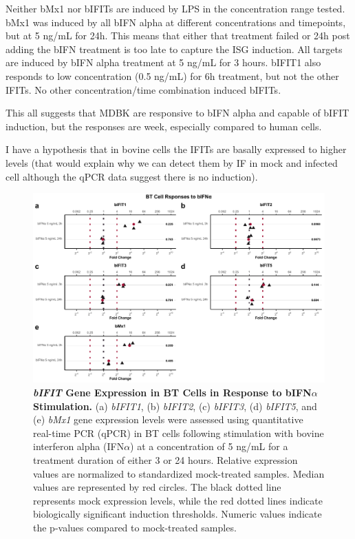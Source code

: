 Neither bMx1 nor bIFITs are induced by LPS in the concentration range tested. bMx1 was induced by all bIFN alpha at different concentrations and timepoints, but at 5 ng/mL for 24h. This means that either that treatment failed or 24h post adding the bIFN treatment is too late to capture the ISG induction. All targets are induced by bIFN alpha treatment at 5 ng/mL for 3 hours. bIFIT1 also responds to low concentration (0.5 ng/mL) for 6h treatment, but not the other IFITs. No other concentration/time combination induced bIFITs. 

This all suggests that MDBK are responsive to bIFN alpha and capable of bIFIT induction, but the responses are week, especially compared to human cells.

I have a hypothesis that in bovine cells the IFITs are basally expressed to higher levels  (that would explain why we can detect them by IF in mock and infected cell although the qPCR data suggest there is no induction).


\begin{figure}
    \centering
    \includegraphics[width=1\linewidth]{07. Chapter 2/Figs/02. Induction/08. bt_bifna.pdf}
    \caption[\textit{bIFIT} Gene Expression in BT Cells in Response to bIFN\(\alpha\) Stimulation.]{\textbf{\textit{bIFIT} Gene Expression in BT Cells in Response to bIFN\(\alpha\) Stimulation.} (a) \textit{bIFIT1}, (b) \textit{bIFIT2}, (c) \textit{bIFIT3}, (d) \textit{bIFIT5}, and (e) \textit{bMx1} gene expression levels were assessed using quantitative real-time PCR (qPCR) in BT cells following stimulation with bovine interferon alpha (IFN\(\alpha\)) at a concentration of 5 ng/mL for a treatment duration of either 3 or 24 hours. Relative expression values are normalized to standardized mock-treated samples. Median values are represented by red circles. The black dotted line represents mock expression levels, while the red dotted lines indicate biologically significant induction thresholds. Numeric values indicate the p-values compared to mock-treated samples.}
    \label{fig:BT responses to bifna}
\end{figure}


